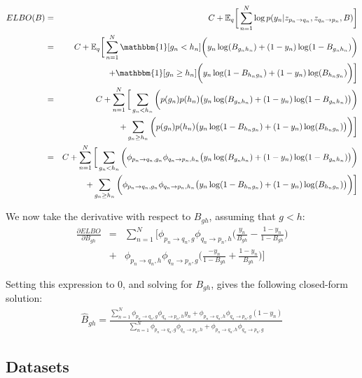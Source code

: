 \begin{eqnarray*}
ELBO(B) &=& C + \mathbb{E}_q\bigg[\sum_{n=1}^N \log p(y_n | z_{p_n \rightarrow q_n}, z_{q_n \rightarrow p_n} , B)\bigg] \\
&=& C+ \mathbb{E}_q\bigg[\sum_{n=1}^N \mathbbm{1}[g_n < h_n]\bigg(y_n \log(B_{g_n h_n}) + (1-y_n) \log(1-B_{g_n h_n})\bigg) \\
&&+ \mathbbm{1}[g_n \geq h_n]\bigg(y_n \log(1-B_{h_n g_n}) + (1-y_n) \log(B_{h_n g_n})\bigg) \bigg] \\
&=& C + \sum_{n=1}^N \bigg[ \sum_{g_n < h_n}\bigg( p(g_n)p(h_n) \big(y_n \log(B_{g_n h_n}) + (1-y_n) \log(1-B_{g_n h_n})\big) \bigg) \\
&&+  \sum_{g_n \geq h_n}\bigg( p(g_n)p(h_n) \big( y_n \log(1-B_{h_n g_n}) + (1-y_n) \log(B_{h_n g_n}) \big) \bigg) \bigg] \\
&=& C + \sum_{n=1}^N \bigg[ \sum_{g_n < h_n}\bigg( \phi_{p_n \rightarrow q_n, g_n} \phi_{q_n \rightarrow p_n, h_n} \big(y_n \log(B_{g_n h_n}) + (1-y_n) \log(1-B_{g_n h_n})\big) \bigg) \\
&&+  \sum_{g_n \geq h_n}\bigg( \phi_{p_n \rightarrow q_n, g_n} \phi_{q_n \rightarrow p_n, h_n} \big( y_n \log(1-B_{h_n g_n}) + (1-y_n) \log(B_{h_n g_n}) \big) \bigg) \bigg] 
\end{eqnarray*}

We now take the derivative with respect to $B_{gh}$, assuming that $g < h$:
\begin{eqnarray*}
\frac{\partial ELBO}{\partial B_{gh}} &=& \sum_{n=1}^N \bigg[ 
\phi_{p_n \rightarrow q_n, g} \phi_{q_n \rightarrow p_n, h} \bigg(\frac{y_n}{B_{gh}} - \frac{1-y_n}{1-B_{gh}}\bigg) \\
&+& \phi_{p_n \rightarrow q_n, h} \phi_{q_n \rightarrow p_n, g} \bigg(\frac{-y_n}{1-B_{gh}} + \frac{1-y_n}{B_{gh}}\bigg) \bigg]
\end{eqnarray*}

Setting this expression to $0$, and solving for $B_{gh}$, gives the following closed-form solution:
\begin{eqnarray*}
\hat{B}_{gh} = \frac{\sum_{n=1}^N \phi_{p_n \rightarrow q_n, g} \phi_{q_n \rightarrow p_n, h} y_n + \phi_{p_n \rightarrow q_n, h} \phi_{q_n \rightarrow p_n, g}(1-y_n)}{\sum_{n=1}^N \phi_{p_n \rightarrow q_n, g} \phi_{q_n \rightarrow p_n, h} + \phi_{p_n \rightarrow q_n, h} \phi_{q_n \rightarrow p_n, g}}
\end{eqnarray*}

\subsection{Datasets}
\label{sec:datasets}

